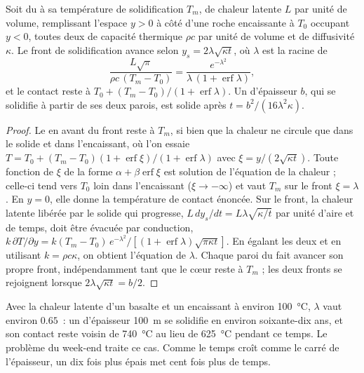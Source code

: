 \begin{proposition}\label{prop:b2:magma-emplacement:stefan}
Soit du  à sa température de solidification $T_m$, de chaleur latente $L$ par unité
de volume, remplissant l'espace $y > 0$ à côté d'une roche encaissante à $T_0$ occupant $y < 0$, toutes deux
de capacité thermique $\rho c$ par unité de volume et de diffusivité $\kappa$. Le
front de solidification avance selon $y_s = 2\lambda\sqrt{\kappa t}$, où $\lambda$
est la racine de
\[
\frac{L\sqrt\pi}{\rho c\,(T_m - T_0)} = \frac{e^{-\lambda^2}}{\lambda\,(1 + \operatorname{erf}\lambda)},
\]
et le contact reste à $T_0 + (T_m - T_0)/(1 + \operatorname{erf}\lambda)$. Un 
d'épaisseur $b$, qui se solidifie à partir de ses deux parois, est solide après
$t = b^2/(16\lambda^2\kappa)$.
\end{proposition}

\begin{proof}
Le  en avant du front reste à $T_m$, si bien que la chaleur ne circule que dans le solide
et dans l'encaissant, où l'on essaie $T = T_0 + (T_m - T_0)(1 + \operatorname{erf}\xi)/(1 +
\operatorname{erf}\lambda)$ avec $\xi = y/(2\sqrt{\kappa t})$. Toute fonction de $\xi$
de la forme $\alpha + \beta\operatorname{erf}\xi$ est solution de l'équation de la chaleur ; celle-ci
tend vers $T_0$ loin dans l'encaissant ($\xi \to -\infty$) et vaut $T_m$ sur le front
$\xi = \lambda$. En $y = 0$, elle donne la température de contact énoncée. Sur le front,
la chaleur latente libérée par le solide qui progresse, $L\,dy_s/dt = L\lambda\sqrt{\kappa/t}$
par unité d'aire et de temps, doit être évacuée par conduction, $k\,\partial T/\partial y = k(T_m -
T_0)\,e^{-\lambda^2}/[(1 + \operatorname{erf}\lambda)\sqrt{\pi\kappa t}]$. En égalant les
deux et en utilisant $k = \rho c\kappa$, on obtient l'équation de $\lambda$. Chaque paroi du
 fait avancer son propre front, indépendamment tant que le cœur reste à $T_m$ ; les deux
fronts se rejoignent lorsque $2\lambda\sqrt{\kappa t} = b/2$.
\end{proof}

Avec la chaleur latente d'un basalte et un encaissant à environ \qty{100}{\celsius},
$\lambda$ vaut environ $0.65$~: un  d'épaisseur \qty{100}{m} se solidifie en environ
soixante-dix ans, et son contact reste voisin de \qty{740}{\celsius} au lieu de
\qty{625}{\celsius} pendant ce temps. Le problème du week-end traite ce cas.
Comme le temps croît comme le carré de l'épaisseur, un  dix fois plus épais
met cent fois plus de temps.

